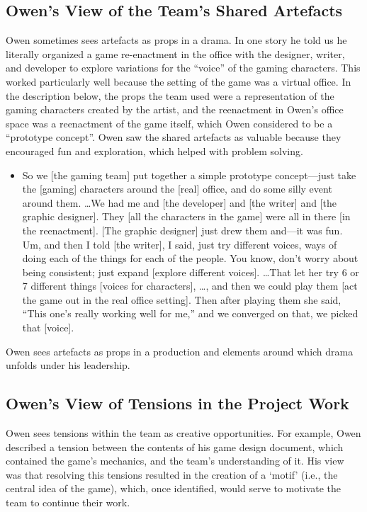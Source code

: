 \documentclass{chi2009}
\begin{document}
\subsection{Owen's View of the Team's Shared Artefacts} 
Owen sometimes sees artefacts as props in a drama. In one story he told us he literally organized a game re-enactment in the office with the designer, writer, and developer to explore variations for the ``voice'' of the gaming characters.  This worked particularly well because the setting of the game was a virtual office. In the description below, the props the team used were a representation of the gaming characters created by the artist, and the reenactment in Owen's office space was a reenactment of the game itself, which Owen considered to be a ``prototype concept''. Owen saw the shared artefacts as valuable because they encouraged fun and exploration, which helped with problem solving.  

\begin{itemize}
\item[] So we [the gaming team] put together a simple prototype concept---just take the [gaming] characters around the [real] office, and  do some silly event around them. \ldots We had me and [the developer] and [the writer] and [the graphic designer]. They [all the characters in the game] were all in there [in the reenactment]. [The graphic designer] just drew them and---it was fun. Um, and then I told [the writer], I said, just try different voices, ways of doing each of the things for each of the people. You know, don't worry about being consistent; just expand [explore different voices]. \ldots That let her try 6 or 7 different things [voices for characters], \dots, and then we could play them [act the game out in the real office setting]. Then after playing them she said, ``This one's really working well for me,'' and we converged on that, we picked that [voice].
\end{itemize}

Owen sees artefacts as props in a production and elements around which drama unfolds under his leadership.  

\subsection{Owen's View of Tensions in the Project Work} 
Owen sees tensions within the team as creative opportunities. For example, Owen described a tension between the contents of his game design document, which contained the game's mechanics, and the team's understanding of it. His view was that resolving this tensions resulted in the creation of a `motif' (i.e., the central idea of the game), which, once identified, would serve to motivate the team to continue their work. 
\end{document}
